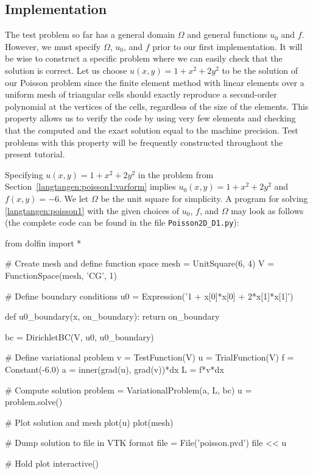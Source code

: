 \subsection{Implementation}
\label{langtangen:poisson1:impl}

The test problem so far has a general domain $\Omega$ and general functions
$u_0$ and $f$. However, 
we must specify $\Omega$, $u_0$, and $f$ prior to our first implementation.
It will be wise to construct a specific problem where we can easily check
that the solution is correct.
Let us choose $u(x,y)=1 + x^2 + 2y^2$ to be the solution of our
Poisson problem since the finite element method with linear elements
over a uniform mesh of triangular cells
should exactly reproduce a second-order polynomial
at the vertices of the cells, regardless of the size
of the elements. This property allows us to verify the code by
using very few elements and
checking that the computed and the exact solution equal to the 
machine precision.
Test problems with this property will be frequently constructed throughout
the present
tutorial. 

Specifying $u(x,y)=1 + x^2 + 2y^2$ in the
problem from Section~\ref{langtangen:poisson1:varform} implies
$u_0(x,y)= 1 + x^2 + 2y^2$
and $f(x,y)=-6$.
We let $\Omega$ be the unit square for simplicity.
A \fenics{} program for solving \eqref{langtangen:poisson1} with the given choices
of $u_0$, $f$, and $\Omega$ may look as follows (the complete code can be
found in the file {\fontsize{10pt}{10pt}\verb!Poisson2D_D1.py!}):

\begin{python}
from dolfin import *

# Create mesh and define function space
mesh = UnitSquare(6, 4)
V = FunctionSpace(mesh, 'CG', 1)

# Define boundary conditions
u0 = Expression('1 + x[0]*x[0] + 2*x[1]*x[1]')

def u0_boundary(x, on_boundary):
    return on_boundary

bc = DirichletBC(V, u0, u0_boundary)

# Define variational problem
v = TestFunction(V)
u = TrialFunction(V)
f = Constant(-6.0)
a = inner(grad(u), grad(v))*dx
L = f*v*dx

# Compute solution
problem = VariationalProblem(a, L, bc)
u = problem.solve()

# Plot solution and mesh
plot(u)
plot(mesh)

# Dump solution to file in VTK format
file = File('poisson.pvd')
file << u

# Hold plot
interactive()
\end{python}

